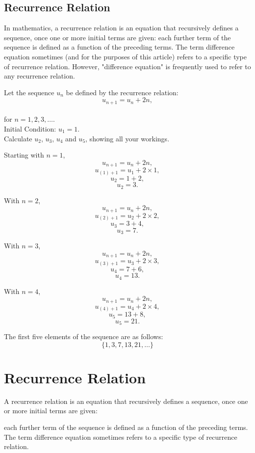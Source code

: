 \documentclass[12pt]{article}
\begin{document}
\subsection*{Recurrence Relation}
In mathematics, a recurrence relation is an equation that recursively defines a sequence, once one or more initial terms are given: each further term of the sequence is defined as a function of the preceding terms.
The term difference equation sometimes (and for the purposes of this article) refers to a specific type of recurrence relation. However, "difference equation" is frequently used to refer to any recurrence relation.




Let the sequence $u_n$ be defined by the recurrence relation:
\[ u_{n+1} = u_n + 2n, \]
\\ \bigskip
for $n=1,2,3,\ldots$. \\ \bigskip Initial Condition: $u_1=1$.\\ \bigskip Calculate $u_2$, $u_3$, $u_4$ and $u_5$, showing all your workings.

Starting with $n=1$,
\[ u_{n+1} = u_n + 2n, \]
\[ u_{(1)+1} = u_{1} + 2\times 1, \]
\[ u_{2} = 1 + 2, \]
\[ u_{2} = 3. \]

With $n=2$,
\[ u_{n+1} = u_n + 2n, \]
\[ u_{(2)+1} = u_{2} + 2\times 2, \]
\[ u_{3} = 3 + 4, \]
\[ u_{3} = 7. \]

With $n=3$,
\[ u_{n+1} = u_n + 2n, \]
\[ u_{(3)+1} = u_{3} + 2\times 3, \]
\[ u_{4} = 7 + 6, \]
\[ u_{4} = 13. \]

With $n=4$,
\[ u_{n+1} = u_n + 2n, \]
\[ u_{(4)+1} = u_{4} + 2\times 4, \]
\[ u_{5} = 13 + 8, \]
\[ u_{5} = 21. \]

The first five elements of the sequence are as follows:
\[ \{1,3,7,13,21, \ldots\}
\]


\section{Recurrence Relation}


A recurrence relation is an equation that recursively defines a sequence, once one or more initial terms are given: 

each further term of the sequence is defined as a function of the preceding terms.
The term difference equation sometimes refers to a specific type of recurrence relation. 
\end{document}
